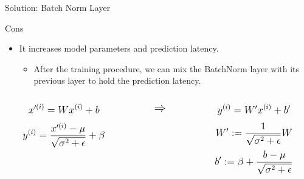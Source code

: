 \begin{frame}{Solution: Batch Norm Layer}
	\begin{block}{Cons}
		\begin{itemize}
			\item It increases model parameters and prediction latency.
			\begin{itemize}
				\item After the training procedure, we can mix the BatchNorm layer with its previous layer to hold the prediction latency.
			\end{itemize}
		\end{itemize}
		\begin{columns}
			\begin{column}[c]{0.45\textwidth}
				\centering
				\begin{equation*}
					\mathlarger{x'^{(i)} = W x^{(i)} + b}
				\end{equation*}
				\begin{equation*}
					\mathlarger{y^{(i)} = \frac{x'^{(i)} - \mu}{\sqrt{\sigma^2 + \epsilon}} + \beta}
				\end{equation*}
			\end{column}
			\begin{column}[c]{0.1\textwidth}
				\centering
				\begin{equation*}
					\mathlarger{\mathlarger{
					\Rightarrow
				}}
				\end{equation*}
			\end{column}
			\begin{column}[c]{0.45\textwidth}
				\centering
				\begin{equation*}
					\mathlarger{y^{(i)} = W' x^{(i)} + b'}
				\end{equation*}
				\begin{equation*}
					\mathlarger{
						W' := \frac{1}{\sqrt{\sigma^2 + \epsilon}} W	
					}
				\end{equation*}
				\begin{equation*}
					\mathlarger{
						b' := \beta + \frac{b- \mu}{\sqrt{\sigma^2 + \epsilon}}	
					}
				\end{equation*}
			\end{column}
		\end{columns}
	\end{block}
\end{frame}